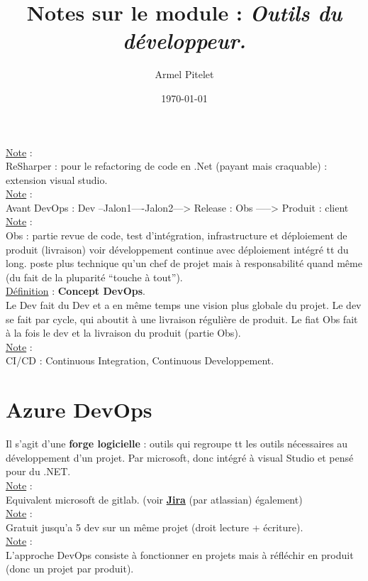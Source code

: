 \documentclass[a4paper,12pt,twoside]{article}
\title{Notes sur le module : \textit{Outils du développeur.}}
\author{Armel Pitelet}
\date{\today}
\newcommand{\urlcolor}{magenta}  %
\newcommand{\keycolor}{purple} %
\newcommand{\note}[1]{\noindent\underline{Note} : \\ \indent #1}
\newcommand{\defi}[2]{\noindent\underline{Définition} : \textbf{#1}.\\ \indent #2}
\newcommand{\keyref}[2]{\hypersetup{urlcolor=\keycolor} \href{#1}{\textbf{#2}}\hypersetup{urlcolor=\urlcolor}}
\begin{document}
\maketitle
\tableofcontents

\note{ReSharper : pour le refactoring de code en .Net (payant mais craquable) : extension visual studio.}\\

\note{Avant DevOps : Dev --Jalon1----Jalon2---> Release : Obs -----> Produit : client}\\

\note{Obs : partie revue de code, test d'intégration,  infrastructure et déploiement de produit (livraison) voir développement continue avec déploiement intégré tt du long. poste plus technique qu'un chef de projet mais à responsabilité quand même (du fait de la pluparité ``touche à tout'').}\\

\defi{Concept DevOps}{Le Dev fait du Dev et a en même temps une vision plus globale du projet. Le dev se fait par cycle, qui aboutit à une livraison régulière de produit. Le fiat Obs fait à la fois le dev et la livraison du produit (partie Obs).}\\

\note{CI/CD : Continuous Integration, Continuous Developpement.}

\section{Azure DevOps}

Il s'agit d'une \textbf{forge logicielle} : outils qui regroupe tt les outils nécessaires au développement d'un projet. Par microsoft, donc intégré à visual Studio et pensé pour du .NET. \\

\note{Equivalent microsoft de gitlab. (voir \keyref{https://www.atlassian.com/fr/software/jira}{Jira} (par atlassian) également)}\\

\note{Gratuit jusqu'a 5 dev sur un même projet (droit lecture + écriture).}\\

\note{L'approche DevOps consiste à fonctionner en projets mais à réfléchir en produit (donc un projet par produit).}\\
\end{document}
